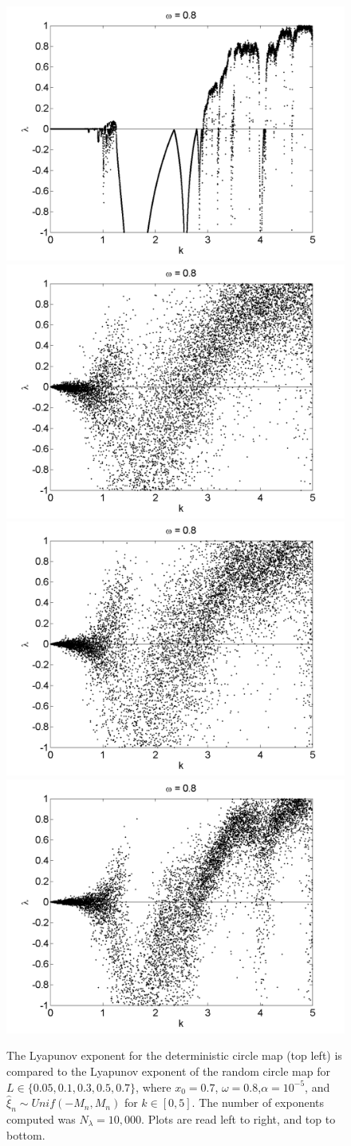 \begin{figure}[!h]
\caption[Lyapunov exponent in the random circle map (uniform distribution) compared to the
deterministic map, varying $k$, $\alpha = 10^{-5}$]{The Lyapunov exponent for the deterministic
  circle map (top left) is compared to the Lyapunov exponent of the random circle map for $L \in \{0.05,0.1,0.3,0.5,0.7\}$, where $x_0=0.7$, $\omega=0.8$,$\alpha = 10^{-5}$, and $\hat{\xi}_n\sim Unif(-M_n,M_n)$ for $k \in [0,5]$. The number of exponents computed was $N_\lambda=10,000$. Plots are read left to right, and top to bottom. }\label{fig:rcirclyap2_u}
\centering
\includegraphics[width=.5\textwidth]{figs/detcirc_n_lyap_10000_w_08_k.png}\hfill
\includegraphics[width=.5\textwidth]{figs/rcirc_u_lyap_10000_L_005_w_08_k.png}\\
\includegraphics[width=.5\textwidth]{figs/rcirc_u_lyap_10000_L_01_w_08_k.png}\hfill
\includegraphics[width=.5\textwidth]{figs/rcirc_u_lyap_10000_L_03_w_08_k.png}\\

\end{figure}
